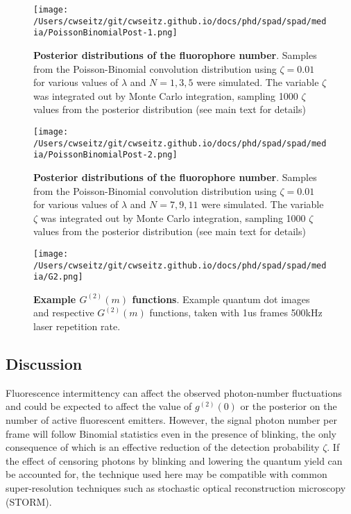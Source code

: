 \begin{figure*}[t]
\centering
\texttt{[image: /Users/cwseitz/git/cwseitz.github.io/docs/phd/spad/spad/media/PoissonBinomialPost-1.png]}
\caption{\textbf{Posterior distributions of the fluorophore number}. Samples from the Poisson-Binomial convolution distribution using $\zeta=0.01$ for various values of $\lambda$ and $N=1,3,5$ were simulated. The variable $\zeta$ was integrated out by Monte Carlo integration, sampling 1000 $\zeta$ values from the posterior distribution (see main text for details)}
\label{fig:fig9}
\end{figure*}    

\begin{figure*}[t]
\centering
\texttt{[image: /Users/cwseitz/git/cwseitz.github.io/docs/phd/spad/spad/media/PoissonBinomialPost-2.png]}
\caption{\textbf{Posterior distributions of the fluorophore number}. Samples from the Poisson-Binomial convolution distribution using $\zeta=0.01$ for various values of $\lambda$ and $N=7,9,11$ were simulated. The variable $\zeta$ was integrated out by Monte Carlo integration, sampling 1000 $\zeta$ values from the posterior distribution (see main text for details)}
\label{fig:fig10}
\end{figure*}    

\begin{figure*}[t]
\centering
\texttt{[image: /Users/cwseitz/git/cwseitz.github.io/docs/phd/spad/spad/media/G2.png]}
\caption{\textbf{Example $G^{(2)}(m)$ functions}. Example quantum dot images and respective $G^{(2)}(m)$ functions, taken with 1us frames 500kHz laser repetition rate.}
\label{fig:fig32}
\end{figure*}    

\subsection{Discussion}

Fluorescence intermittency can affect the observed photon-number fluctuations and could be expected to affect the value of $g^{(2)}(0)$ or the posterior on the number of active fluorescent emitters. However, the signal photon number per frame will follow Binomial statistics even in the presence of blinking, the only consequence of which is an effective reduction of the detection probability $\zeta$. If the effect of censoring photons by blinking and lowering the quantum yield can be accounted for, the technique used here may be compatible with common super-resolution techniques such as stochastic optical reconstruction microscopy (STORM). 

